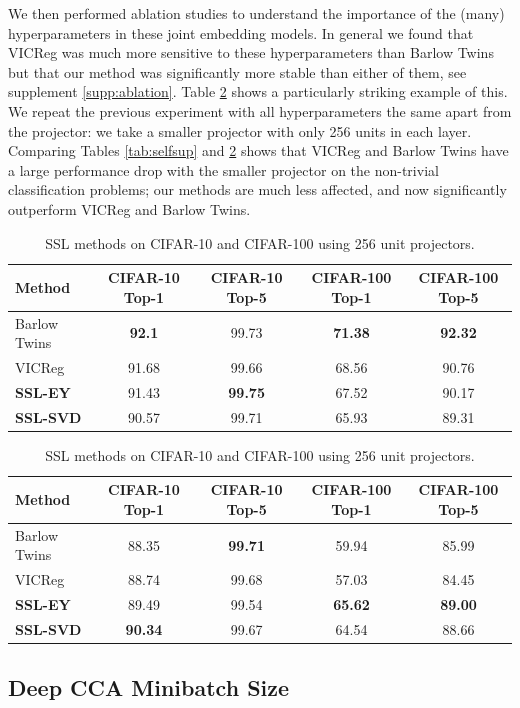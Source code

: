 We then performed ablation studies to understand the importance of the (many) hyperparameters in these joint embedding models. In general we found that VICReg was much more sensitive to these hyperparameters than Barlow Twins but that our method was significantly more stable than either of them, see supplement \ref{supp:ablation}.
Table \ref{tab:selfsupsmaller} shows a particularly striking example of this. 
We repeat the previous experiment with all hyperparameters the same apart from the projector: we take a smaller projector with only 256 units in each layer. 
Comparing Tables \ref{tab:selfsup} and \ref{tab:selfsupsmaller} shows that VICReg and Barlow Twins have a large performance drop with the smaller projector on the non-trivial classification problems; our methods are much less affected, and now significantly outperform VICReg and Barlow Twins.
 

\begin{table}[h] 
\centering 
\begin{tabular}{lcccc} 
\hline 
Method & CIFAR-10 Top-1 & CIFAR-10 Top-5 & CIFAR-100 Top-1 & CIFAR-100 Top-5 \\ 
\hline 
Barlow Twins & \textbf{92.1} & 99.73 & \textbf{71.38} & \textbf{92.32}\\
VICReg & 91.68	&99.66 & 68.56&	90.76 \\
\textbf{SSL-EY} & 91.43& \textbf{99.75}& 67.52& 90.17\\
\textbf{SSL-SVD} & 90.57 & 99.71 & 65.93 & 89.31 \\
\hline 
\end{tabular} \caption{SSL methods on CIFAR-10 and CIFAR-100 using 2048 unit projectors.} \label{tab:selfsup}
\centering 
\begin{tabular}{lcccc} 
\hline 
Method & CIFAR-10 Top-1 & CIFAR-10 Top-5 & CIFAR-100 Top-1 & CIFAR-100 Top-5 \\ 
\hline 
Barlow Twins & 88.35 & \textbf{99.71} & 59.94 & 85.99 \\
VICReg & 88.74 & 99.68 & 57.03& 84.45 \\
\textbf{SSL-EY} & 89.49 & 99.54 & \textbf{65.62}& \textbf{89.00}\\
\textbf{SSL-SVD} & \textbf{90.34} & 99.67 & 64.54 & 88.66 \\
\hline 
\end{tabular} \caption{SSL methods on CIFAR-10 and CIFAR-100 using 256 unit projectors.} \label{tab:selfsupsmaller} \end{table}


\subsection{Deep CCA Minibatch Size}

